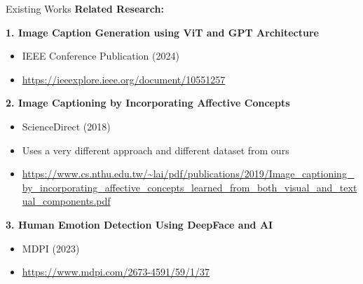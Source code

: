 \documentclass{beamer}
\begin{document}
\begin{frame}{Existing Works}
    \textbf{Related Research:}
    
    \vspace{0.5cm}
    
    \textbf{1. Image Caption Generation using ViT and GPT Architecture}
    \begin{itemize}
        \item IEEE Conference Publication (2024)
        \item \small \url{https://ieeexplore.ieee.org/document/10551257}
    \end{itemize}
    
    \vspace{0.4cm}
    
    \textbf{2. Image Captioning by Incorporating Affective Concepts}
    \begin{itemize}
        \item ScienceDirect (2018)
        \item Uses a very different approach and different dataset from ours
        \item \small \url{https://www.cs.nthu.edu.tw/~lai/pdf/publications/2019/Image_captioning_by_incorporating_affective_concepts_learned_from_both_visual_and_textual_components.pdf}
    \end{itemize}
    
    \vspace{0.4cm}
    
    \textbf{3. Human Emotion Detection Using DeepFace and AI}
    \begin{itemize}
        \item MDPI (2023)
        \item \small \url{https://www.mdpi.com/2673-4591/59/1/37}
    \end{itemize}
\end{frame}
\end{document}
